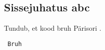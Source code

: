 \documentclass{article}
\begin{document}
\subsection*{Sissejuhatus abc}
Tundub, et kood  bruh Pärisori .
\begin{tcolorbox}
\begin{verbatim}
 Bruh 
\end{verbatim}
\end{tcolorbox}
\end{document}
